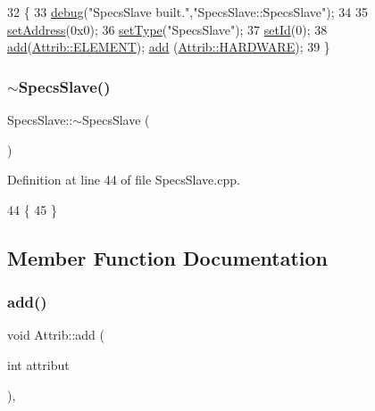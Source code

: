 \begin{DoxyCode}
32                       \{ 
33   \hyperlink{classObject_aac010553f022165573714b7014a15f0d}{debug}(\textcolor{stringliteral}{"SpecsSlave built."},\textcolor{stringliteral}{"SpecsSlave::SpecsSlave"});
34 
35   \hyperlink{classSpecsSlave_a1e5917c1f323cd7b4aabe4940c6baf12}{setAddress}(0x0);
36   \hyperlink{classObject_aae534cc9d982bcb9b99fd505f2e103a5}{setType}(\textcolor{stringliteral}{"SpecsSlave"});
37   \hyperlink{classObject_a398fe08cba594a0ce6891d59fe4f159f}{setId}(0);
38   \hyperlink{classAttrib_a235f773af19c900264a190b00a3b4ad7}{add}(\hyperlink{classAttrib_a69e171d7cc6417835a5a306d3c764235a7788bc5dd333fd8ce18562b269c9dab1}{Attrib::ELEMENT}); \hyperlink{classAttrib_a235f773af19c900264a190b00a3b4ad7}{add} (\hyperlink{classAttrib_a69e171d7cc6417835a5a306d3c764235a61ceb22149f365f1780d18f9d1459423}{Attrib::HARDWARE});
39 \}
\end{DoxyCode}
\mbox{\label{classSpecsSlave_a8194c1d1a4e7a0e250e5b7dd72b0b437}} 
\subsubsection{\texorpdfstring{$\sim$\+Specs\+Slave()}{~SpecsSlave()}}
{\footnotesize\ttfamily Specs\+Slave\+::$\sim$\+Specs\+Slave (\begin{DoxyParamCaption}{ }\end{DoxyParamCaption})}



Definition at line 44 of file Specs\+Slave.\+cpp.


\begin{DoxyCode}
44                        \{  
45 \}
\end{DoxyCode}


\subsection{Member Function Documentation}
\mbox{\label{classAttrib_a235f773af19c900264a190b00a3b4ad7}} 
\subsubsection{\texorpdfstring{add()}{add()}}
{\footnotesize\ttfamily void Attrib\+::add (\begin{DoxyParamCaption}\item[{int}]{attribut }\end{DoxyParamCaption})\hspace{0.3cm}{\ttfamily [inline]}, {\ttfamily [inherited]}}

